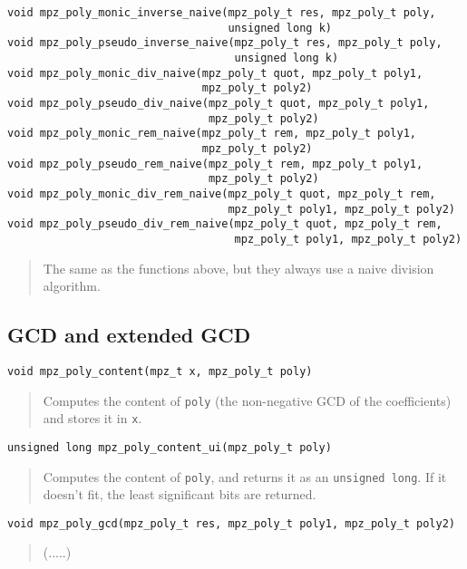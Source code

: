 \documentclass[a4paper,10pt]{article}
\newcommand{\code}{\lstinline}
\begin{document}
\begin{lstlisting}
void mpz_poly_monic_inverse_naive(mpz_poly_t res, mpz_poly_t poly,
                                  unsigned long k)
void mpz_poly_pseudo_inverse_naive(mpz_poly_t res, mpz_poly_t poly,
                                   unsigned long k)
void mpz_poly_monic_div_naive(mpz_poly_t quot, mpz_poly_t poly1,
                              mpz_poly_t poly2)
void mpz_poly_pseudo_div_naive(mpz_poly_t quot, mpz_poly_t poly1,
                               mpz_poly_t poly2)
void mpz_poly_monic_rem_naive(mpz_poly_t rem, mpz_poly_t poly1,
                              mpz_poly_t poly2)
void mpz_poly_pseudo_rem_naive(mpz_poly_t rem, mpz_poly_t poly1,
                               mpz_poly_t poly2)
void mpz_poly_monic_div_rem_naive(mpz_poly_t quot, mpz_poly_t rem,
                                  mpz_poly_t poly1, mpz_poly_t poly2)
void mpz_poly_pseudo_div_rem_naive(mpz_poly_t quot, mpz_poly_t rem, 
                                   mpz_poly_t poly1, mpz_poly_t poly2)
\end{lstlisting}
\begin{quote}
The same as the functions above, but they always use a naive division algorithm.
\end{quote}



\subsection{GCD and extended GCD}

\begin{lstlisting}
void mpz_poly_content(mpz_t x, mpz_poly_t poly)
\end{lstlisting}
\begin{quote}
Computes the content of \code{poly} (the non-negative GCD of the coefficients) and stores it in \code{x}.
\end{quote}

\begin{lstlisting}
unsigned long mpz_poly_content_ui(mpz_poly_t poly)
\end{lstlisting}
\begin{quote}
Computes the content of \code{poly}, and returns it as an \code{unsigned long}. If it doesn't fit, the least significant bits are returned.
\end{quote}

\begin{lstlisting}
void mpz_poly_gcd(mpz_poly_t res, mpz_poly_t poly1, mpz_poly_t poly2)
\end{lstlisting}
\begin{quote}
(.....)
\end{quote}
\end{document}
